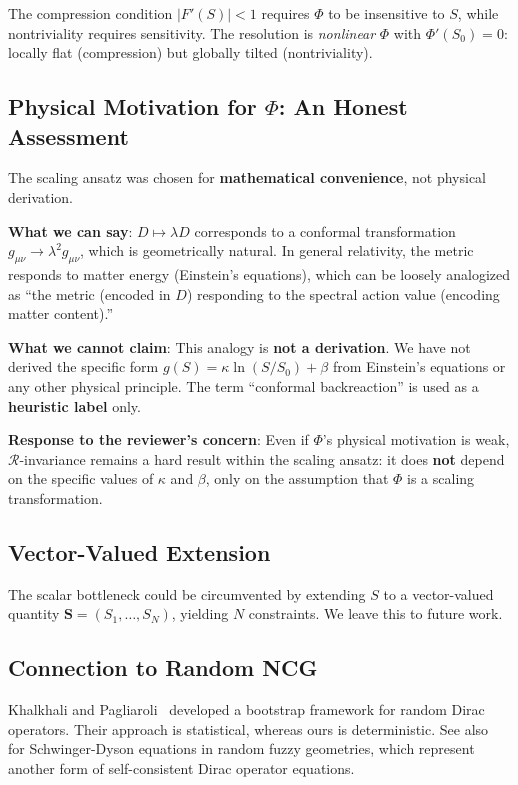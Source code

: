 \documentclass[11pt,a4paper]{article}
\theoremstyle{remark}
\newcommand{\R}{\mathcal{R}}
\begin{document}
The compression condition $|F'(S)| < 1$ requires $\Phi$ to be insensitive to $S$, while nontriviality requires sensitivity. The resolution is \emph{nonlinear} $\Phi$ with $\Phi'(S_0) = 0$: locally flat (compression) but globally tilted (nontriviality).

\subsection{Physical Motivation for $\Phi$: An Honest Assessment}

The scaling ansatz was chosen for \textbf{mathematical convenience}, not physical derivation.

\textbf{What we can say}: $D \mapsto \lambda D$ corresponds to a conformal transformation $g_{\mu\nu} \to \lambda^2 g_{\mu\nu}$, which is geometrically natural. In general relativity, the metric responds to matter energy (Einstein's equations), which can be loosely analogized as ``the metric (encoded in $D$) responding to the spectral action value (encoding matter content).''

\textbf{What we cannot claim}: This analogy is \textbf{not a derivation}. We have not derived the specific form $g(S) = \kappa\ln(S/S_0) + \beta$ from Einstein's equations or any other physical principle. The term ``conformal backreaction'' is used as a \textbf{heuristic label} only.

\textbf{Response to the reviewer's concern}: Even if $\Phi$'s physical motivation is weak, $\R$-invariance remains a hard result within the scaling ansatz: it does \textbf{not} depend on the specific values of $\kappa$ and $\beta$, only on the assumption that $\Phi$ is a scaling transformation.

\subsection{Vector-Valued Extension}

The scalar bottleneck could be circumvented by extending $S$ to a vector-valued quantity $\mathbf{S} = (S_1, \ldots, S_N)$, yielding $N$ constraints. We leave this to future work.

\subsection{Connection to Random NCG}

Khalkhali and Pagliaroli~\cite{Kha25} developed a bootstrap framework for random Dirac operators. Their approach is statistical, whereas ours is deterministic. See also~\cite{GKP26} for Schwinger-Dyson equations in random fuzzy geometries, which represent another form of self-consistent Dirac operator equations.
\end{document}

